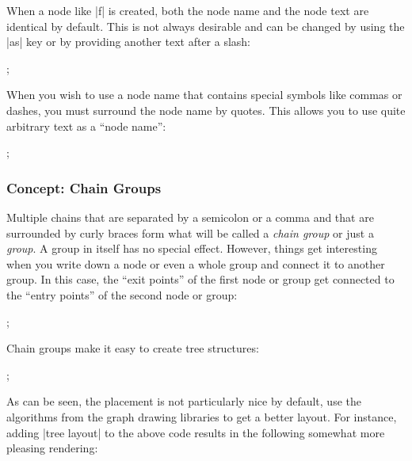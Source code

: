 When a node like |f| is created, both the node name and the node text
are identical by default. This is not always desirable and can be
changed by using the |as| key or by providing another text after
a slash:

\begin{codeexample}[]
\tikz {};  
\end{codeexample}

When you wish to use a node name that contains special symbols like
commas or dashes, you must surround the node name by quotes. This
allows you to use quite arbitrary text as a ``node name'':
\begin{codeexample}[]
\tikz {};  
\end{codeexample}


\subsubsection{Concept: Chain Groups}

Multiple chains that are separated by a semicolon or a comma and that
are surrounded by curly braces form what will be called a \emph{chain
  group} or just a \emph{group}. A group in itself has no special
effect. However, things get interesting when you write down a node or
even a whole group and connect it to another group. In this case, the
``exit points'' of the first node or group get connected to the
``entry points'' of the second node or group:

\begin{codeexample}[]
\tikz {};  
\end{codeexample}

Chain groups make it easy to create tree structures:

\begin{codeexample}[width=10cm]
\tikz
  ;
\end{codeexample}

As can be seen, the placement is not particularly nice by default, use
the algorithms from the graph drawing libraries to get a better
layout. For instance, adding |tree layout| to the above code results in the
following somewhat more pleasing rendering:
\ifluatex
\medskip

